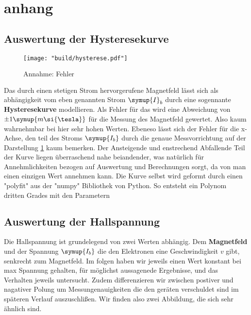 \section{anhang}

\subsection{Auswertung der Hysteresekurve}
\label{sec:auswertung_hyst}

\begin{figure}
    \centering
    \texttt{[image: "build/hysterese.pdf"]}
    \caption{Annahme: Fehler }
    \label{fig:Bfeld}
 \end{figure}

 
 Das durch einen stetigen Strom hervorgerufene Magnetfeld lässt sich als abhängigkeit vom eben genannten Strom $\symup{I}_b$ durch eine sogennante \textbf{Hysteresekurve} modellieren.
 Als Fehler für das wird eine Abweichung von $\pm 1 \symup{m\si{\tesla}}$ für die Messung des Magnetfeld gewertet. Also kaum wahrnehmbar bei hier sehr hohen Werten. Ebeneso lässt sich der Fehler für die x-Achse, den teil des Stroms 
 $\symup{I_b}$ durch die genaue Messvorrichtung auf der Darstellung \ref{fig:Bfeld} kaum bemerken.
 Der Ansteigende und enstrechend Abfallende Teil der Kurve liegen überraschend nahe beiandender, was natürlich für Annehmlichkeiten bezogen auf Auswertung und Berechnungen sorgt, da von man einen einzigen Wert annehmen kann.
 Die Kurve selbst wird geformt durch einen "polyfit" aus der "numpy" Bibliothek von Python. So entsteht ein Polynom dritten Grades mit den Parametern %



\subsection{Auswertung der Hallspannung}
\label{sec:auswertung_hall}

Die Hallspannung ist grundelegend von zwei Werten abhängig. Dem \textbf{Magnetfeld} und der Spannung  $\symup{I_b}$ die den Elektronen eine Geschwindigkeit $v$ gibt, senkrecht zum Magnetfeld. %
Im folgen haben wir jeweils einen Wert konstant bei max Spannung gehalten, für möglichst aussagenede Ergebnisse, und das Verhalten jeweils untersucht. 
Zudem differenzieren wir zwischen postiver und nagativer Polung um Messungenauigkeiten die den geräten verschuldet sind im späteren Verlauf auszuschlißen. %
Wir finden also zwei Abbildung, die sich sehr ähnlich sind.

